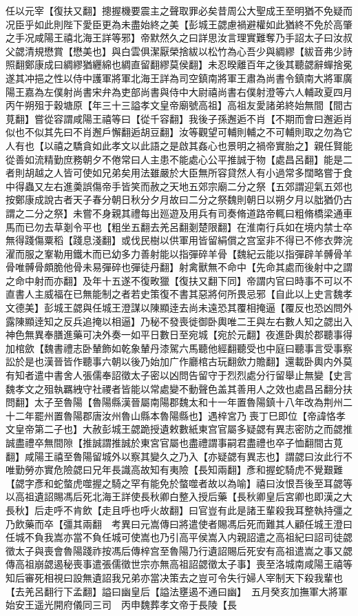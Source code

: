 任以元宰【復扶又翻】摠握機要震主之聲取罪必矣昔周公大聖成王至明猶不免疑而况臣乎如此則陛下愛臣更為未盡始終之美【彭城王勰慮禍避權如此猶終不免於高肇之手况咸陽王禧北海王詳等邪】帝默然久之曰詳思汝言理實難奪乃手詔太子曰汝叔父勰清規懋賞【懋美也】與白雲俱潔厭榮捨紱以松竹為心吾少與綢繆【紱音弗少詩照翻鄭康成曰綢繆猶纒綿也綢直留翻繆莫侯翻】未忍暌離百年之後其聽勰辭蟬捨冕遂其冲挹之性以侍中護軍將軍北海王詳為司空鎮南將軍王肅為尚書令鎮南大將軍廣陽王嘉為左僕射尚書宋弁為吏部尚書與侍中大尉禧尚書右僕射澄等六人輔政夏四月丙午朔殂于穀塘原【年三十三謚孝文皇帝廟號高祖】高祖友愛諸弟終始無間【間古莧翻】嘗從容謂咸陽王禧等曰【從千容翻】我後子孫邂逅不肖【不期而會曰邂逅肖似也不似其先曰不肖邂戶懈翻逅胡豆翻】汝等觀望可輔則輔之不可輔則取之勿為它人有也【以禧之驕貪如此孝文以此語之是啟其姦心也景明之禍帝實胎之】親任賢能從善如流精勤庶務朝夕不倦常曰人主患不能處心公平推誠于物【處昌呂翻】能是二者則胡越之人皆可使如兄弟矣用法雖嚴於大臣無所容貸然人有小過常多闊略嘗于食中得蟲又左右進羮誤傷帝手皆笑而赦之天地五郊宗廟二分之祭【五郊謂迎氣五郊也按鄭康成說古者天子春分朝日秋分夕月故曰二分之祭魏則朝日以朔夕月以朏猶仍古謂之二分之祭】未嘗不身親其禮每出廵遊及用兵有司奏脩道路帝輒曰粗脩橋梁通車馬而已勿去草剗令平也【粗坐五翻去羌呂翻剗楚限翻】在淮南行兵如在境内禁士卒無得踐傷粟稻【踐息淺翻】或伐民樹以供軍用皆留絹償之宫室非不得已不修衣弊浣濯而服之鞌勒用鐵木而已幼多力善射能以指彈碎羊骨【魏紀云能以指彈辟羊髆骨羊骨唯髆骨頗脆他骨未易彈碎也彈徒丹翻】射禽獸無不命中【先命其處而後射中之謂之命中射而亦翻】及年十五遂不復畋獵【復扶又翻下同】帝謂内官曰時事不可以不直書人主威福在已無能制之者若史策復不書其惡將何所畏忌邪【自此以上史言魏孝文德美】彭城王勰與任城王澄謀以陳顯逹去尚未遠恐其覆相掩逼【覆反也恐凶問外露陳顯逹知之反兵追掩以相逼】乃秘不發喪徙御卧輿唯二王與左右數人知之勰出入神色無異奉膳進藥可决外奏一如平日數日至宛城【宛於元翻】夜進卧輿於郡聽事得加棺歛【魏書禮志卧輦飾如乾象輦丹漆駕六馬聽他經翻聽受也中庭曰聽事言受事察訟於是也漢晉皆作聽事六朝以後乃始加广作廳棺古玩翻歛力贍翻】還載卧輿内外莫有知者遣中書舍人張儒奉詔徵太子密以凶問告留守于烈烈處分行留舉止無變【史言魏孝文之殂執羈絏守社禝者皆能以常處變不動聲色盖其善用人之效也處昌呂翻分扶問翻】太子至魯陽【魯陽縣漢晉屬南陽郡魏太和十一年置魯陽鎮十八年改為荆州二十二年罷州置魯陽郡唐汝州魯山縣本魯陽縣也】遇梓宮乃喪丁巳即位【帝諱恪孝文皇帝第二子也】大赦彭城王勰跪授遺敕數紙東宫官屬多疑勰有異志密防之而勰推誠盡禮卒無間隙【推誠謂推誠於東宮官屬也盡禮謂事嗣君盡禮也卒子恤翻間古莧翻】咸陽王禧至魯陽留城外以察其變久之乃入【亦疑勰有異志也】謂勰曰汝此行不唯勤勞亦實危險勰曰兄年長識高故知有夷險【長知兩翻】彥和握蛇騎虎不覺艱難【勰字彥和蛇螫虎噬握之騎之罕有能免於螫噬者故以為喻】禧曰汝恨吾後至耳勰等以高祖遺詔賜馮后死北海王詳使長秋卿白整入授后藥【長秋卿皇后宮卿也即漢之大長秋】后走呼不肯飲【走且呼也呼火故翻】曰官豈有此是諸王輩殺我耳整執持彊之乃飲藥而卒【彊其兩翻　考異曰元嵩傳曰將遣使者賜馮后死而難其人顧任城王澄曰任城不負我嵩亦當不負任城可使嵩也乃引高平侯嵩入内親詔遣之高祖紀曰詔司徒勰徵太子與喪會魯陽踐祚按馮后傳梓宫至魯陽乃行遺詔賜后死安有高祖遣嵩之事又勰傳高祖崩勰遏秘喪事遣張儒徵世宗亦無高祖詔勰徵太子事】喪至洛城南咸陽王禧等知后審死相視曰設無遺詔我兄弟亦當决策去之豈可令失行婦人宰制天下殺我輩也【去羌呂翻行下孟翻】謚曰幽皇后【謚法壅遏不通曰幽】　五月癸亥加撫軍大將軍始安王遥光開府儀同三司　丙申魏葬孝文帝于長陵【長